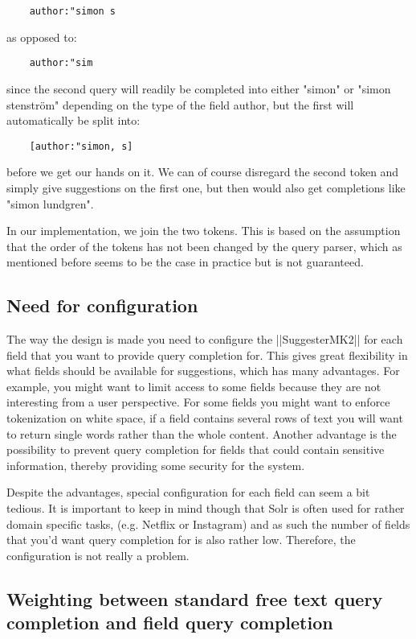 \begin{verbatim}
    author:"simon s
\end{verbatim}
as opposed to:
\begin{verbatim}
    author:"sim
\end{verbatim}
since the second query will readily be completed into either "simon" or "simon stenström" depending on the type of the field author, but the first will automatically be split into:
\begin{verbatim}
    [author:"simon, s]
\end{verbatim}
before we get our hands on it. We can of course disregard the second token and simply give suggestions on the first one, but then would also get completions like "simon lundgren".

In our implementation, we join the two tokens. This is based on the assumption that the order of the tokens has not been changed by the query parser, which as mentioned before seems to be the case in practice but is not guaranteed. 


\subsection{Need for configuration}

The way the design is made you need to configure the ||SuggesterMK2|| for each field that you want to provide query completion for. This gives great flexibility in what fields should be available for suggestions, which has many advantages. For example, you might want to limit access to some fields because they are not interesting from a user perspective. For some fields you might want to enforce tokenization on white space, if a field contains several rows of text you will want to return single words rather than the whole content.  Another advantage is the possibility to prevent query completion for fields that could contain sensitive information, thereby providing some security for the system.

Despite the advantages, special configuration for each field can seem a bit tedious. It is important to keep in mind though that Solr is often used for rather domain specific tasks, (e.g. Netflix or Instagram) and as such the number of fields that you’d want query completion for is also rather low. Therefore, the configuration is not really a problem.  

\subsection{Weighting between standard free text query completion and field query completion}

